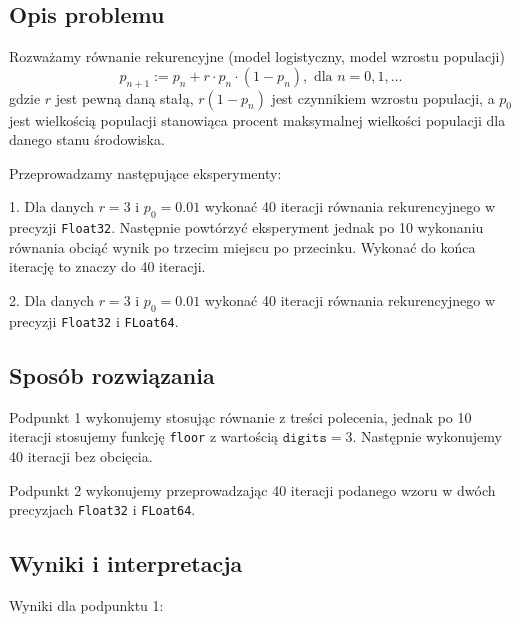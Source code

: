 \documentclass{article}
\begin{document}
\subsection*{Opis problemu} 
Rozważamy równanie rekurencyjne (model logistyczny, model wzrostu populacji)
\begin{equation}
    p_{n+1} := p_n + r \cdot p_n \cdot (1 - p_n), \text{ dla } n = 0,1,\dots
    \label{5.rek}
\end{equation}
gdzie $r$ jest pewną daną stałą, $r(1 - p_n)$ jest czynnikiem wzrostu populacji, a $p_0$ jest wielkością populacji stanowiąca procent maksymalnej wielkości populacji dla danego stanu środowiska.

Przeprowadzamy następujące eksperymenty:

1. Dla danych $r=3$ i $p_0=0.01$ wykonać 40 iteracji równania rekurencyjnego w precyzji \texttt{Float32}. Następnie powtórzyć eksperyment jednak po 10 wykonaniu równania obciąć wynik po trzecim miejscu po przecinku. Wykonać do końca iterację to znaczy do 40 iteracji.

2. Dla danych $r=3$ i $p_0=0.01$ wykonać 40 iteracji równania rekurencyjnego w precyzji \texttt{Float32} i \texttt{FLoat64}.
\subsection*{Sposób rozwiązania} 
Podpunkt 1 wykonujemy stosując równanie z treści polecenia, jednak po 10 iteracji stosujemy funkcję \texttt{floor} z wartością $\texttt{digits}=3$. Następnie wykonujemy 40 iteracji bez obcięcia.


Podpunkt 2 wykonujemy przeprowadzając 40 iteracji podanego wzoru w dwóch precyzjach \texttt{Float32} i \texttt{FLoat64}.
\subsection*{Wyniki i interpretacja}

Wyniki dla podpunktu 1:
\end{document}
